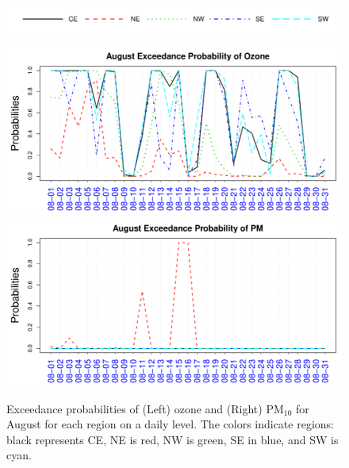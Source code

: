 \documentclass[alpha-refs]{wiley-article}
\begin{document}
\vspace{-8mm}  

 \begin{figure}[H]
  \begin{center}
  \hspace{.1\textwidth}
  \includegraphics[width=\textwidth]{phase_reg_legend}

  \vspace{-4mm}

      \includegraphics[width=.45\textwidth]{exceed_prob_O3_aug}
      \includegraphics[width=.45\textwidth]{exceed_prob_PM10_aug}

  \end{center}
  \vspace{-6mm}
       \caption{Exceedance probabilities of (Left) ozone and (Right) $\text{PM}_{10}$ for August for each region on a daily level. The colors indicate regions: black represents CE, NE is red, NW is green, SE in blue, and SW is cyan.}\label{fig:prob_aug_O3}
\end{figure}
\vspace{-12mm}  
\end{document}
